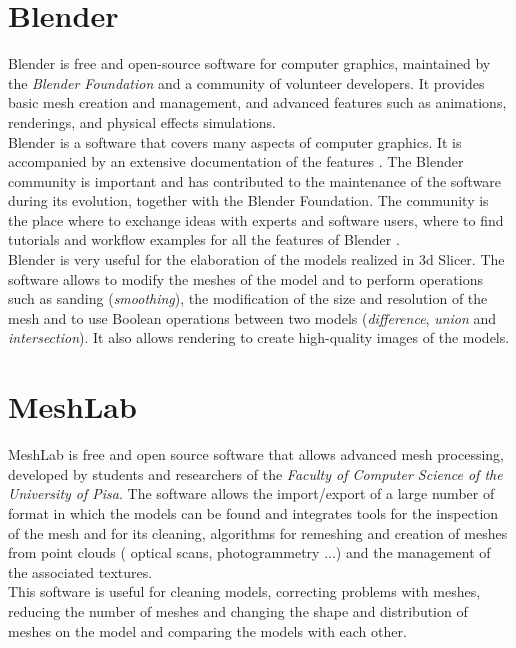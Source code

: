 \section{Blender}
Blender \parencite{Reference32} is free and open-source software for computer graphics, maintained by the \emph{Blender Foundation} and a community of volunteer developers. It provides basic mesh creation and management, and advanced features such as animations, renderings, and physical effects simulations. \\
Blender is a software that covers many aspects of computer graphics. It is accompanied by an extensive documentation of the features \parencite{Reference33}. The Blender community is important and has contributed to the maintenance of the software during its evolution, together with the Blender Foundation. The community is the place where to exchange ideas with experts and software users, where to find tutorials and workflow examples for all the features of Blender \parencite{Reference34}. \\
Blender is very useful for the elaboration of the models realized in 3d Slicer. The software allows to modify the meshes of the model and to perform operations such as sanding (\emph{smoothing}), the modification of the size and resolution of the mesh and to use Boolean operations between two models (\emph{difference}, \emph{union} and \emph{intersection}). It also allows rendering to create high-quality images of the models.

\section{MeshLab}
MeshLab \parencite{Reference36} is free and open source software that allows advanced mesh processing, developed by students and researchers of the \emph{Faculty of Computer Science of the University of Pisa}. The software allows the import/export of a large number of format in which the models can be found and integrates tools for the inspection of the mesh and for its cleaning, algorithms for remeshing and creation of meshes from point clouds ( optical scans, photogrammetry ...) and the management of the associated textures. \\
This software is useful for cleaning models, correcting problems with meshes, reducing the number of meshes and changing the shape and distribution of meshes on the model and comparing the models with each other.

